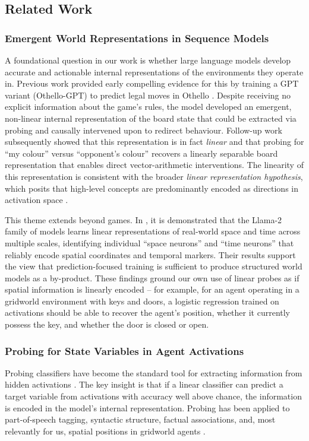 \documentclass[final]{sparreport}
\begin{document}
\subsection{Related Work}\label{sec:related_work}

\subsubsection{Emergent World Representations in Sequence Models}
A foundational question in our work is whether large language models develop accurate and actionable internal representations of the environments they operate in.
Previous work provided early compelling evidence for this by training a GPT variant (Othello-GPT) to predict legal moves in Othello \cite{li2023emergent}.
Despite receiving no explicit information about the game's rules, the model developed an emergent, non-linear internal representation of the board state that could be extracted via probing and causally intervened upon to redirect behaviour.
Follow-up work subsequently showed that this representation
is in fact \emph{linear} \cite{nanda-etal-2023-emergent} and that probing for ``my colour'' versus ``opponent's colour'' recovers a linearly separable board representation that enables direct vector-arithmetic interventions.
The linearity of this representation is consistent with the broader \emph{linear representation hypothesis}, which posits that high-level concepts are predominantly encoded as directions in activation space \cite{park2023linear}.
 
This theme extends beyond games. In \cite{gurnee2024language}, it is demonstrated that the Llama-2 family of models learns linear representations of real-world space and time across multiple scales, identifying individual ``space neurons'' and ``time neurons'' that reliably encode spatial coordinates and temporal markers.
Their results support the view that prediction-focused training is sufficient to produce structured world models as a by-product. These findings ground our own use of linear probes as if spatial information is linearly encoded -- for example, for an agent operating in a gridworld environment with keys and doors, a logistic regression trained on activations should be able to recover the agent's position, whether it currently possess the key, and whether the door is closed or open.
 
\subsubsection{Probing for State Variables in Agent Activations}
Probing classifiers have become the standard tool for extracting information from hidden activations \cite{alain2016understanding}.
The key insight is that if a linear classifier can predict a target
variable from activations with accuracy well above chance, the information is encoded in the model's internal representation.
Probing has been applied to part-of-speech tagging, syntactic structure, factual associations,
and, most relevantly for us, spatial positions in gridworld agents \cite{tenney2019bert, meng2022locating}.
 
\end{document}
